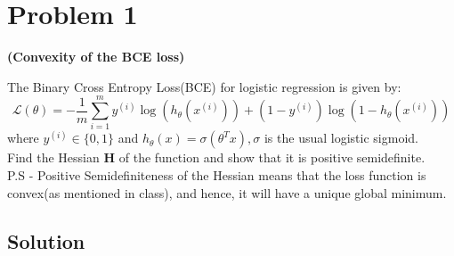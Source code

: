 \section*{Problem 1}

\textbf{(Convexity of the BCE loss)}

The Binary Cross Entropy Loss(BCE) for logistic regression is given by:
\[
    \mathcal{L}(\theta)=-\frac{1}{m} \sum_{i=1}^{m} y^{(i)} \log \left(h_{\theta}\left(x^{(i)}\right)\right)+\left(1-y^{(i)}\right) \log \left(1-h_{\theta}\left(x^{(i)}\right)\right)
\]
where \( y^{(i)} \in\{0,1\} \) and \( h_{\theta}(x)=\sigma\left(\theta^{T} x\right), \sigma \) is the usual logistic sigmoid.\\
Find the Hessian \( \mathbf{H} \) of the function and show that it is positive semidefinite.\\
P.S - Positive Semidefiniteness of the Hessian means that the loss function is convex(as mentioned in class), and hence, it will have a unique global minimum.

\subsection*{Solution}
